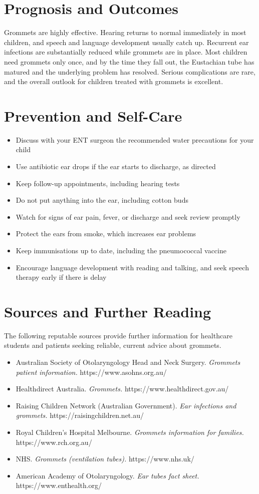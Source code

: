 \section*{Prognosis and Outcomes}
Grommets are highly effective. Hearing returns to normal immediately in most children, and speech and language development usually catch up. Recurrent ear infections are substantially reduced while grommets are in place. Most children need grommets only once, and by the time they fall out, the Eustachian tube has matured and the underlying problem has resolved. Serious complications are rare, and the overall outlook for children treated with grommets is excellent.

\section*{Prevention and Self-Care}
\begin{itemize}
    \item Discuss with your ENT surgeon the recommended water precautions for your child
    \item Use antibiotic ear drops if the ear starts to discharge, as directed
    \item Keep follow-up appointments, including hearing tests
    \item Do not put anything into the ear, including cotton buds
    \item Watch for signs of ear pain, fever, or discharge and seek review promptly
    \item Protect the ears from smoke, which increases ear problems
    \item Keep immunisations up to date, including the pneumococcal vaccine
    \item Encourage language development with reading and talking, and seek speech therapy early if there is delay
\end{itemize}

\section*{Sources and Further Reading}
The following reputable sources provide further information for healthcare students and patients seeking reliable, current advice about grommets.

\begin{itemize}
    \item Australian Society of Otolaryngology Head and Neck Surgery. \textit{Grommets patient information.} https://www.asohns.org.au/
    \item Healthdirect Australia. \textit{Grommets.} https://www.healthdirect.gov.au/
    \item Raising Children Network (Australian Government). \textit{Ear infections and grommets.} https://raisingchildren.net.au/
    \item Royal Children's Hospital Melbourne. \textit{Grommets information for families.} https://www.rch.org.au/
    \item NHS. \textit{Grommets (ventilation tubes).} https://www.nhs.uk/
    \item American Academy of Otolaryngology. \textit{Ear tubes fact sheet.} https://www.enthealth.org/
\end{itemize}
